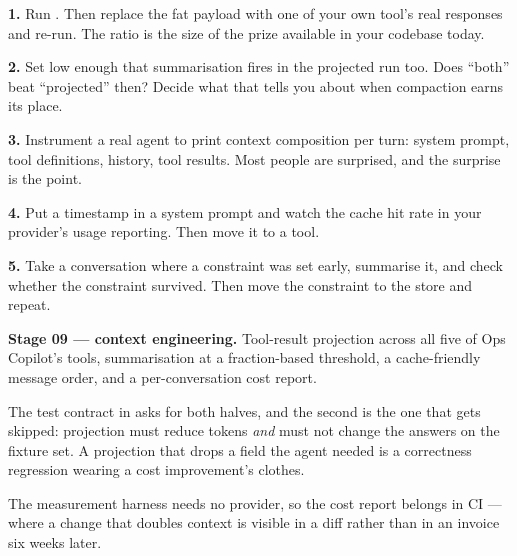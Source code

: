 \begin{exercisebox}
\textbf{1.} Run . Then replace the fat payload
with one of your own tool's real responses and re-run. The ratio is the size of
the prize available in your codebase today.

\textbf{2.} Set  low enough that summarisation fires in the
projected run too. Does ``both'' beat ``projected'' then? Decide what that tells
you about when compaction earns its place.

\textbf{3.} Instrument a real agent to print context composition per turn: system
prompt, tool definitions, history, tool results. Most people are surprised, and
the surprise is the point.

\textbf{4.} Put a timestamp in a system prompt and watch the cache hit rate in
your provider's usage reporting. Then move it to a tool.

\textbf{5.} Take a conversation where a constraint was set early, summarise it,
and check whether the constraint survived. Then move the constraint to the store
and repeat.
\end{exercisebox}

\begin{projectbox}
\textbf{Stage 09 --- context engineering.} Tool-result projection across all five
of Ops Copilot's tools, summarisation at a fraction-based threshold, a
cache-friendly message order, and a per-conversation cost report.

The test contract in  asks for both halves, and
the second is the one that gets skipped: projection must reduce tokens
\emph{and} must not change the answers on the fixture set. A projection that
drops a field the agent needed is a correctness regression wearing a cost
improvement's clothes.

The measurement harness needs no provider, so the cost report belongs in CI ---
where a change that doubles context is visible in a diff rather than in an
invoice six weeks later.
\end{projectbox}
